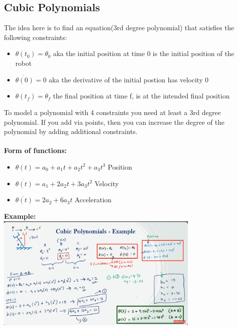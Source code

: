 \documentclass{article}
\begin{document}
\subsection{Cubic Polynomials}
The idea here is to find an equation(3rd degree polynomial) that satisfies the following constraints:\\
\begin{itemize}
    \item $\theta(t_0)=\theta_0$ aka the initial position at time 0 is the initial position of the robot
    \item $\dot{\theta(0)}=0$ aka the derivative of the initial postion has velocity 0
    \item $\theta(t_f) = \theta_f$ the final position at time f, is at the intended final position
\end{itemize}
To model a polynomial with 4 constraints you need at least a 3rd degree polynomial. If you add via points, then you can increase the degree of the polynomial by adding additional constraints. \\\\
\textbf{Form of functions:}\\
\begin{itemize}
    \item $\theta(t)=a_0+a_1t+a_2t^2+a_3t^3$ Position
    \item $\dot{\theta(t)}=a_1+2a_2t+3a_3t^2$ Velocity
    \item $\ddot{\theta(t)}=2a_2+6a_3t$ Acceleration
\end{itemize}
\textbf{Example:}\\
\includegraphics[width=10cm]{cubic_polynomial_example.png}
\end{document}
